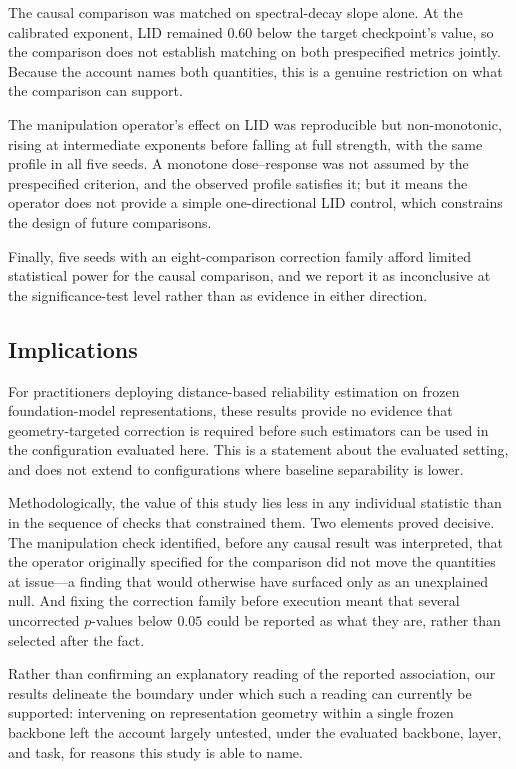 The causal comparison was matched on spectral-decay slope alone. At the
calibrated exponent, LID remained $0.60$ below the target checkpoint's value,
so the comparison does not establish matching on both prespecified metrics
jointly. Because the account names both quantities, this is a genuine
restriction on what the comparison can support.

The manipulation operator's effect on LID was reproducible but
non-monotonic, rising at intermediate exponents before falling at full
strength, with the same profile in all five seeds. A monotone dose--response
was not assumed by the prespecified criterion, and the observed profile
satisfies it; but it means the operator does not provide a simple
one-directional LID control, which constrains the design of future
comparisons.

Finally, five seeds with an eight-comparison correction family afford limited
statistical power for the causal comparison, and we report it as
inconclusive at the significance-test level rather than as evidence in either
direction.

\subsection{Implications}

For practitioners deploying distance-based reliability estimation on frozen
foundation-model representations, these results provide no evidence that
geometry-targeted correction is required before such estimators can be used
in the configuration evaluated here. This is a statement about the evaluated
setting, and does not extend to configurations where baseline separability is
lower.

Methodologically, the value of this study lies less in any individual
statistic than in the sequence of checks that constrained them. Two elements
proved decisive. The manipulation check identified, before any causal result
was interpreted, that the operator originally specified for the comparison
did not move the quantities at issue---a finding that would otherwise have
surfaced only as an unexplained null. And fixing the correction
family before execution meant that several uncorrected $p$-values below
$0.05$ could be reported as what they are, rather than selected after the
fact.

Rather than confirming an explanatory reading of the reported association,
our results delineate the boundary under which such a reading can currently
be supported: intervening on representation geometry within a single frozen
backbone left the account largely untested, under the evaluated backbone,
layer, and task, for reasons this study is able to name.
